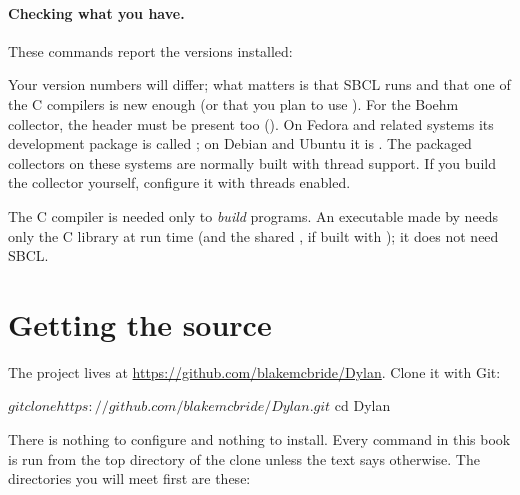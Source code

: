 \paragraph{Checking what you have.} These commands report the versions
installed:


Your version numbers will differ; what matters is that SBCL runs and that
one of the C compilers is new enough (or that you plan to use
). For the Boehm collector, the header 
must be present too (). On Fedora and related
systems its development package is called ; on Debian and
Ubuntu it is . The packaged collectors on these systems
are normally built with thread support. If you build the collector
yourself, configure it with threads enabled.

\begin{notebox}
The C compiler is needed only to \emph{build} programs. An executable made
by  needs only the C library at run time (and the shared
, if built with ); it does not need SBCL.
\end{notebox}

\section{Getting the source}\label{sec:start-source}

The project lives at \url{https://github.com/blakemcbride/Dylan}. Clone
it with Git:

\begin{shell}
$ git clone https://github.com/blakemcbride/Dylan.git
$ cd Dylan
\end{shell}

There is nothing to configure and nothing to install. Every command in
this book is run from the top directory of the clone unless the text says
otherwise. The directories you will meet first are these:

